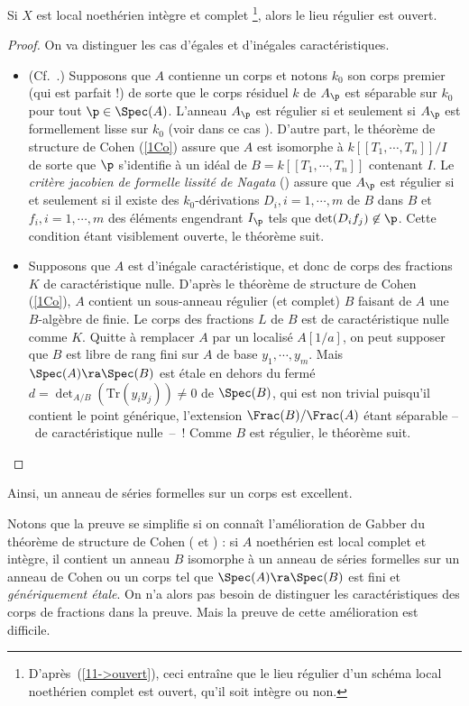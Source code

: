 \documentclass[10pt]{../fichiers-configuration-latex/smfart}
\begin{document}
\begin{theoreme}[Nagata]\label{1complet-exc} Si $X$ est local noethérien intègre et complet
\footnote{D'après~(\ref{11->ouvert}), ceci entraîne que le lieu régulier d'un schéma local
noethérien complet est ouvert, qu'il soit intègre ou non.}, alors le lieu régulier est
ouvert.\end{theoreme} \begin{proof} On va distinguer les cas d'égales et d'inégales
caractéristiques.

\begin{itemize} \item[Cas I] (Cf.~.) Supposons que $A$ contienne un corps et
notons ${k_0}$ son corps premier (qui est parfait !) de sorte que le corps résiduel $k$ de $A_\p$
est séparable sur ${k_0}$ pour tout $\p\in\Spec(A)$. L'anneau $A_\p$ est régulier si et seulement si
$A_\p$ est formellement lisse sur ${k_0}$ (voir dans ce cas ). D'autre part,
le théorème de structure de Cohen (\ref{1Co}) assure que $A$ est isomorphe à $k[[T_1,\cdots,T_n]]/I$
de sorte que $\p$ s'identifie à un idéal de $B=k[[T_1,\cdots,T_n]]$ contenant $I$. Le \emph{critère
jacobien de formelle lissité de Nagata} () assure que $A_\p$ est régulier si
et seulement si il existe des ${k_0}$-dérivations $D_i,i=1,\cdots,m$ de $B$ dans $B$ et
$f_i,i=1,\cdots,m$ des éléments engendrant $I_\p$ tels que $\det(D_if_j)\not\in\p$. Cette condition
étant visiblement ouverte, le théorème suit.

\item[Cas II] Supposons que $A$ est d'inégale caractéristique, et donc de  corps des fractions $K$
de caractéristique nulle. D'après le théorème de structure de Cohen (\ref{1Co}), $A$ contient un
sous-anneau régulier (et complet) $B$ faisant de $A$ une $B$-algèbre de finie. Le corps des
fractions $L$ de $B$ est de caractéristique nulle comme $K$.  Quitte à remplacer $A$ par un localisé
$A[1/a]$, on peut supposer que $B$ est libre de rang fini sur $A$ de base $y_1,\cdots,y_m$.  Mais
$\Spec(A)\ra\Spec(B)$ est étale en dehors du fermé $d=\det_{A/B}(\mathrm{Tr}(y_iy_j))\not=0$ de
$\Spec(B)$, qui est non trivial puisqu'il contient le point générique, l'extension
$\Frac(B)/\Frac(A)$ étant séparable -- de caractéristique nulle -- ! Comme $B$ est régulier, le
théorème suit.  \end{itemize} \end{proof}


\begin{remarque}\label{1Coh-Gab} Ainsi, un anneau de séries formelles sur un corps est excellent.

Notons que la preuve se simplifie si on connaît l'amélioration de Gabber du théorème de structure de
Cohen ( et ) : si $A$ noethérien est
local complet et intègre, il contient un anneau $B$ isomorphe à un anneau de séries formelles sur un
anneau de Cohen ou un corps tel que $\Spec(A)\ra\Spec(B)$ est fini et \emph{génériquement étale}. On
n'a alors pas besoin de distinguer les caractéristiques des corps de fractions dans la preuve. Mais
la preuve de cette amélioration est difficile.  \end{remarque}
\end{document}
